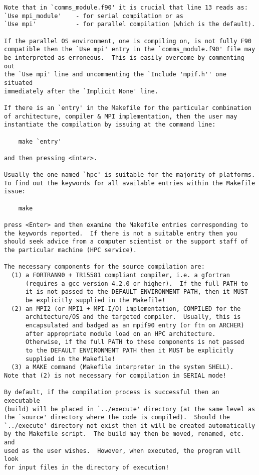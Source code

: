 \begin{verbatim}
Note that in `comms_module.f90' it is crucial that line 13 reads as:
`Use mpi_module'    - for serial compilation or as
`Use mpi'           - for parallel compilation (which is the default).

If the parallel OS environment, one is compiling on, is not fully F90
compatible then the `Use mpi' entry in the `comms_module.f90' file may
be interpreted as erroneous.  This is easily overcome by commenting out
the `Use mpi' line and uncommenting the `Include 'mpif.h'' one situated
immediately after the `Implicit None' line.

If there is an `entry' in the Makefile for the particular combination
of architecture, compiler & MPI implementation, then the user may
instantiate the compilation by issuing at the command line:

	make `entry'

and then pressing <Enter>.

Usually the one named `hpc' is suitable for the majority of platforms.
To find out the keywords for all available entries within the Makefile
issue:

	make

press <Enter> and then examine the Makefile entries corresponding to
the keywords reported.  If there is not a suitable entry then you
should seek advice from a computer scientist or the support staff of
the particular machine (HPC service).

The necessary components for the source compilation are:
  (1) a FORTRAN90 + TR15581 compliant compiler, i.e. a gfortran
      (requires a gcc version 4.2.0 or higher).  If the full PATH to
      it is not passed to the DEFAULT ENVIRONMENT PATH, then it MUST
      be explicitly supplied in the Makefile!
  (2) an MPI2 (or MPI1 + MPI-I/O) implementation, COMPILED for the
      architecture/OS and the targeted compiler.  Usually, this is
      encapsulated and badged as an mpif90 entry (or ftn on ARCHER)
      after appropriate module load on an HPC architecture.
      Otherwise, if the full PATH to these components is not passed
      to the DEFAULT ENVIRONMENT PATH then it MUST be explicitly
      supplied in the Makefile!
  (3) a MAKE command (Makefile interpreter in the system SHELL).
Note that (2) is not necessary for compilation in SERIAL mode!

By default, if the compilation process is successful then an executable
(build) will be placed in `../execute' directory (at the same level as
the `source' directory where the code is compiled).  Should the
`../execute' directory not exist then it will be created automatically
by the Makefile script.  The build may then be moved, renamed, etc. and
used as the user wishes.  However, when executed, the program will look
for input files in the directory of execution!


\end{verbatim}
